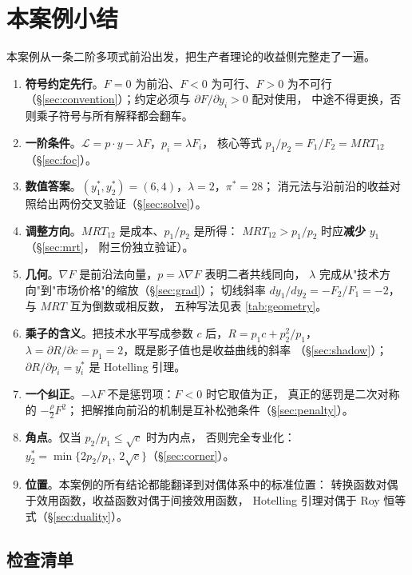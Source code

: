 \section{本案例小结}
\label{sec:summary}

本案例从一条二阶多项式前沿出发，把生产者理论的收益侧完整走了一遍。

\begin{enumerate}
  \item \textbf{符号约定先行}。$F=0$ 为前沿、$F<0$ 为可行、$F>0$ 为不可行
        （\S\ref{sec:convention}）；约定必须与 $\partial F/\partial y_i>0$ 配对使用，
        中途不得更换，否则乘子符号与所有解释都会翻车。
  \item \textbf{一阶条件}。$\mathcal{L}=p\cdot y-\lambda F$，$p_i=\lambda F_i$，
        核心等式 $p_1/p_2=F_1/F_2=MRT_{12}$（\S\ref{sec:foc}）。
  \item \textbf{数值答案}。$(y_1^{*},y_2^{*})=(6,4)$，$\lambda=2$，$\pi^{*}=28$；
        消元法与沿前沿的收益对照给出两份交叉验证（\S\ref{sec:solve}）。
  \item \textbf{调整方向}。$MRT_{12}$ 是成本、$p_1/p_2$ 是所得：
        $MRT_{12}>p_1/p_2$ 时应\textbf{减少} $y_1$（\S\ref{sec:mrt}，
        附三份独立验证）。
  \item \textbf{几何}。$\nabla F$ 是前沿法向量，$p=\lambda\nabla F$ 表明二者共线同向，
        $\lambda$ 完成从"技术方向"到"市场价格"的缩放（\S\ref{sec:grad}）；
        切线斜率 $dy_1/dy_2=-F_2/F_1=-2$，与 $MRT$ 互为倒数或相反数，
        五种写法见表 \ref{tab:geometry}。
  \item \textbf{乘子的含义}。把技术水平写成参数 $c$ 后，$R=p_1c+p_2^{2}/p_1$，
        $\lambda=\partial R/\partial c=p_1=2$，既是影子值也是收益曲线的斜率
        （\S\ref{sec:shadow}）；$\partial R/\partial p_i=y_i^{*}$ 是 Hotelling 引理。
  \item \textbf{一个纠正}。$-\lambda F$ 不是惩罚项：$F<0$ 时它取值为正，
        真正的惩罚是二次对称的 $-\frac{\rho}{2}F^{2}$；
        把解推向前沿的机制是互补松弛条件（\S\ref{sec:penalty}）。
  \item \textbf{角点}。仅当 $p_2/p_1\le\sqrt{c}$ 时为内点，
        否则完全专业化：$y_2^{*}=\min\{2p_2/p_1,\,2\sqrt{c}\}$（\S\ref{sec:corner}）。
  \item \textbf{位置}。本案例的所有结论都能翻译到对偶体系中的标准位置：
        转换函数对偶于效用函数，收益函数对偶于间接效用函数，
        Hotelling 引理对偶于 Roy 恒等式（\S\ref{sec:duality}）。
\end{enumerate}

\subsection{检查清单}

